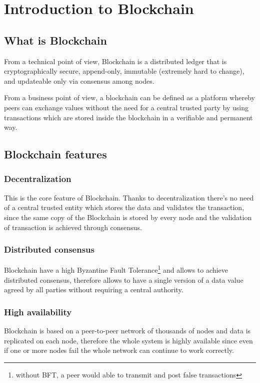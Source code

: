\section{Introduction to Blockchain}
\subsection{What is Blockchain}
From a technical point of view, Blockchain is a distributed ledger that is cryptographically
secure, append-only, immutable (extremely hard to change), and updateable only
via consensus among nodes.

From a business point of view, a blockchain can be defined as a platform
whereby peers can exchange values without the need for a central trusted party
by using transactions which are stored inside the blockchain in a verifiable and
permanent way.












\subsection{Blockchain features}

\subsubsection*{Decentralization}
This is the core feature of Blockchain. Thanks to decentralization there's no
need of a central trusted entity which stores the data and validates the
transaction, since the same copy of the Blockchain is stored by every node and
the validation of transaction is achieved through consensus.

\subsubsection*{Distributed consensus}
Blockchain have a high Byzantine Fault Tolerance\footnote{without BFT, a peer
would able to transmit and post false transactions} and allows to achieve
distributed consensus, therefore allows to have a single version of a data value
agreed by all parties without requiring a central authority.

\subsubsection*{High availability}
Blockchain is based on a peer-to-peer network of thousands of nodes and data is
replicated on each node, therefore the whole system is highly available since even
if one or more nodes fail the whole network can continue to work correctly.



